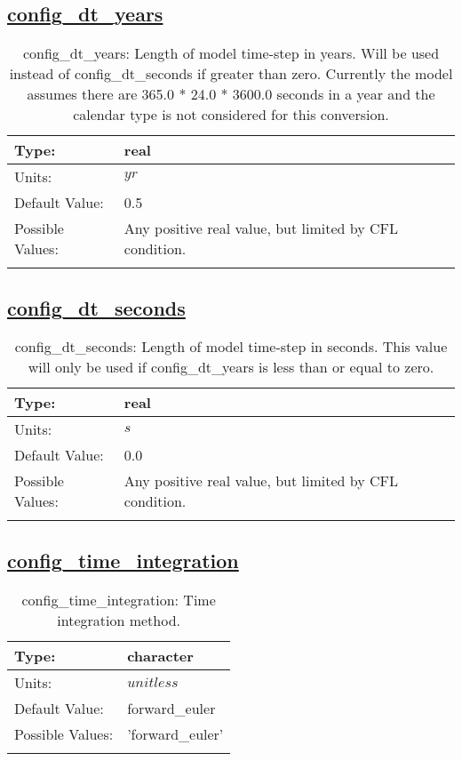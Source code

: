 \subsection[config\_dt\_years]{\hyperref[sec:nm_tab_time_integration]{config\_dt\_years}}
\label{subsec:nm_sec_config_dt_years}
\begin{center}
\begin{longtable}{| p{2.0in} | p{4.0in} |}
    \hline
    Type: & real \\
    \hline
    Units: & $yr$ \\
    \hline
    Default Value: & 0.5 \\
    \hline
    Possible Values: & Any positive real value, but limited by CFL condition. \\
    \hline
    \caption{config\_dt\_years: Length of model time-step in years.  Will be used instead of config\_dt\_seconds if greater than zero.  Currently the model assumes there are 365.0 * 24.0 * 3600.0 seconds in a year and the calendar type is not considered for this conversion.}
\end{longtable}
\end{center}
\subsection[config\_dt\_seconds]{\hyperref[sec:nm_tab_time_integration]{config\_dt\_seconds}}
\label{subsec:nm_sec_config_dt_seconds}
\begin{center}
\begin{longtable}{| p{2.0in} | p{4.0in} |}
    \hline
    Type: & real \\
    \hline
    Units: & $s$ \\
    \hline
    Default Value: & 0.0 \\
    \hline
    Possible Values: & Any positive real value, but limited by CFL condition. \\
    \hline
    \caption{config\_dt\_seconds: Length of model time-step in seconds.  This value will only be used if config\_dt\_years is less than or equal to zero.}
\end{longtable}
\end{center}
\subsection[config\_time\_integration]{\hyperref[sec:nm_tab_time_integration]{config\_time\_integration}}
\label{subsec:nm_sec_config_time_integration}
\begin{center}
\begin{longtable}{| p{2.0in} | p{4.0in} |}
    \hline
    Type: & character \\
    \hline
    Units: & $unitless$ \\
    \hline
    Default Value: & forward\_euler \\
    \hline
    Possible Values: & 'forward\_euler' \\
    \hline
    \caption{config\_time\_integration: Time integration method.}
\end{longtable}
\end{center}
